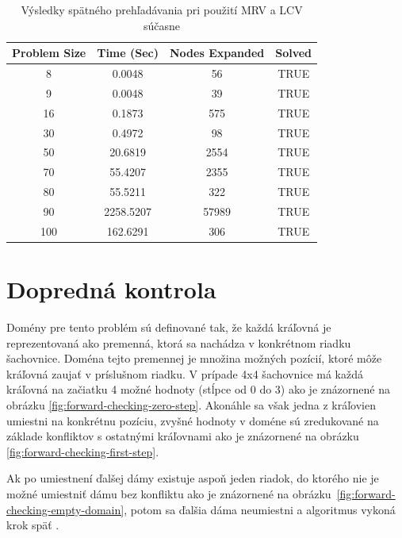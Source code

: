 \begin{table}[h!]
  \centering
  \begin{tabular}{|c|c|c|c|}
    \hline
    \textbf{Problem Size} & \textbf{Time (Sec)} & \textbf{Nodes Expanded} & \textbf{Solved} \\
    \hline
    8   & 0.0048 & 56    & TRUE \\
    9   & 0.0048 & 39    & TRUE \\
    16  & 0.1873 & 575   & TRUE \\
    30  & 0.4972 & 98    & TRUE \\
    50  & 20.6819 & 2554  & TRUE \\
    70  & 55.4207 & 2355  & TRUE \\
    80  & 55.5211 & 322   & TRUE \\
    90  & 2258.5207 & 57989 & TRUE \\
    100 & 162.6291 & 306   & TRUE \\
    \hline
  \end{tabular}
  \caption{Výsledky spätného prehľadávania pri použití MRV a LCV súčasne}
  \label{tab:backtracing_extended_results}
\end{table}

\section*{Dopredná kontrola}
Domény pre tento problém sú definované tak, že každá kráľovná je reprezentovaná ako premenná, ktorá sa nachádza v konkrétnom riadku šachovnice. Doména tejto premennej je množina možných pozícií, ktoré môže kráľovná zaujať v príslušnom riadku. V prípade 4x4 šachovnice má každá kráľovná na začiatku 4 možné hodnoty (stĺpce od 0 do 3) ako je znázornené na obrázku \ref{fig:forward-checking-zero-step}. Akonáhle sa však jedna z kráľovien umiestni na konkrétnu pozíciu, zvyšné hodnoty v doméne sú zredukované na základe konfliktov s ostatnými kráľovnami ako je znázornené na obrázku \ref{fig:forward-checking-first-step}.\par

Ak po umiestnení ďalšej dámy existuje aspoň jeden riadok, do ktorého nie je možné umiestniť dámu bez konfliktu ako je znázornené na obrázku~\ref{fig:forward-checking-empty-domain}, potom sa ďalšia dáma neumiestni a algoritmus vykoná krok späť .


